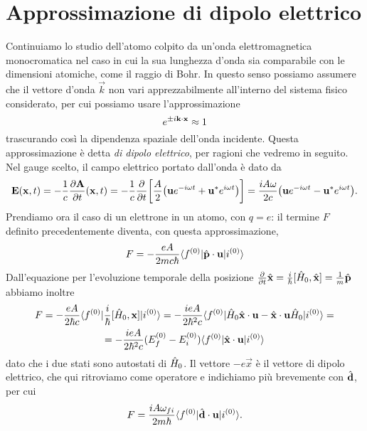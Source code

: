 \section{Approssimazione di dipolo elettrico}
Continuiamo lo studio dell'atomo colpito da un'onda elettromagnetica monocromatica nel caso in cui la sua lunghezza d'onda sia comparabile con le dimensioni atomiche, come il raggio di Bohr.
In questo senso possiamo assumere che il vettore d'onda $\vec k$ non vari apprezzabilmente all'interno del sistema fisico considerato, per cui possiamo usare l'approssimazione
\begin{equation}
	e^{\pm i{\mathbf{k}}\cdot{\mathbf{x}}}\approx 1
\end{equation}
trascurando cos\`i la dipendenza spaziale dell'onda incidente.
Questa approssimazione è detta \emph{di dipolo elettrico}, per ragioni che vedremo in seguito.
Nel gauge scelto, il campo elettrico portato dall'onda è dato da
\begin{equation}
	\mathbf{E}(\mathbf{x},t)=-\frac1{c}\frac{\partial {\mathbf{A}}}{\partial {t}}(\mathbf{x},t)=-\frac1{c}\frac{\partial {}}{\partial {t}}\bigg[\frac{A}2\big(\mathbf{u}e^{-i\omega t}+\mathbf{u}^*e^{i\omega t}\big)\bigg]=
	\frac{iA\omega}{2c}\big(\mathbf{u}e^{-i\omega t}-\mathbf{u}^*e^{i\omega t}\big).
	\label{eq:campo-elettrico-approssimazione-dipolo}
\end{equation}
Prendiamo ora il caso di un elettrone in un atomo, con $q=e$: il termine $F$ definito precedentemente diventa, con questa approssimazione,
\begin{equation}
	F=-\frac{eA}{2mc\hbar}\langle f^{(0)}\rvert{\hat{\mathbf{p}}}\cdot{\mathbf{u}}\lvert i^{(0)}\rangle
\end{equation}
Dall'equazione per l'evoluzione temporale della posizione $\frac{\partial {}}{\partial {t}}\hat{\mathbf{x}}=\frac{i}{\hbar}[\hat{H}_0,\hat{\mathbf{x}}]=\frac1{m}\hat{\mathbf{p}}$ abbiamo inoltre
\begin{multline}
	F=-\frac{eA}{2\hbar c}\langle f^{(0)}\rvert\frac{i}{\hbar}[\hat{H}_0,\mathbf{x}]\lvert i^{(0)}\rangle=
	-\frac{ieA}{2\hbar^2c}\langle f^{(0)}\rvert\hat{H}_0{\hat{\mathbf{x}}}\cdot{\mathbf{u}}-{\hat{\mathbf{x}}}\cdot{\mathbf{u}}\hat{H}_0\lvert i^{(0)}\rangle=\\=
	-\frac{ieA}{2\hbar^2c}(E_f^{(0)}-E_i^{(0)})\langle f^{(0)}\rvert{\hat{\mathbf{x}}}\cdot{\mathbf{u}}\lvert i^{(0)}\rangle
\end{multline}
dato che i due stati sono autostati di $\hat{H}_0$.
Il vettore $-e\vec x$ è il vettore di dipolo elettrico, che qui ritroviamo come operatore e indichiamo più brevemente con $\hat{\mathbf{d}}$, per cui
\begin{equation}
	F=\frac{iA\omega_{fi}}{2m\hbar}\langle f^{(0)}\rvert{\hat{\mathbf{d}}}\cdot{\mathbf{u}}\lvert i^{(0)}\rangle.
\end{equation}

